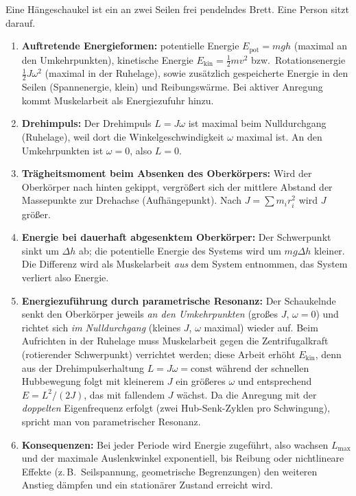 \documentclass[11pt,a4paper]{article}
\begin{document}
Eine Hängeschaukel ist ein an zwei Seilen frei pendelndes Brett.
Eine Person sitzt darauf.

\begin{enumerate}
  \item \textbf{Auftretende Energieformen:} potentielle Energie
        $E_{\mathrm{pot}}=mgh$ (maximal an den Umkehrpunkten),
        kinetische Energie $E_{\mathrm{kin}}=\tfrac{1}{2}mv^{2}$
        bzw.\ Rotationsenergie $\tfrac{1}{2}J\omega^{2}$ (maximal
        in der Ruhelage), sowie zusätzlich gespeicherte Energie in
        den Seilen (Spannenergie, klein) und Reibungswärme.
        Bei aktiver Anregung kommt Muskelarbeit als Energie\-zufuhr
        hinzu.
  \item \textbf{Drehimpuls:} Der Drehimpuls $L=J\omega$ ist
        maximal beim Nulldurchgang (Ruhelage), weil dort die
        Winkelgeschwindigkeit $\omega$ maximal ist. An den
        Umkehrpunkten ist $\omega=0$, also $L=0$.
  \item \textbf{Trägheitsmoment beim Absenken des Oberkörpers:}
        Wird der Oberkörper nach hinten gekippt, vergrößert sich
        der mittlere Abstand der Massepunkte zur Drehachse
        (Aufhängepunkt). Nach $J=\sum m_{i}r_{i}^{2}$ wird
        $J$ größer.
  \item \textbf{Energie bei dauerhaft abgesenktem Oberkörper:}
        Der Schwerpunkt sinkt um $\Delta h$ ab; die potentielle
        Energie des Systems wird um $mg\Delta h$ kleiner. Die
        Differenz wird als Muskelarbeit \emph{aus} dem System
        entnommen, das System verliert also Energie.
  \item \textbf{Energiezuführung durch parametrische Resonanz:}
        Der Schaukelnde senkt den Oberkörper jeweils \emph{an
        den Umkehrpunkten} (großes $J$, $\omega=0$) und richtet
        sich \emph{im Nulldurchgang} (kleines $J$, $\omega$
        maximal) wieder auf. Beim Aufrichten in der Ruhelage muss
        Muskelarbeit gegen die Zentrifugalkraft (rotierender
        Schwerpunkt) verrichtet werden; diese Arbeit erhöht
        $E_{\mathrm{kin}}$, denn aus der Drehimpulserhaltung
        $L=J\omega=\mathrm{const}$ während der schnellen
        Hubbewegung folgt mit kleinerem $J$ ein größeres
        $\omega$ und entsprechend
        $E=L^{2}/(2J)$, das mit fallendem $J$ wächst. Da die
        Anregung mit der \emph{doppelten} Eigenfrequenz erfolgt
        (zwei Hub-Senk-Zyklen pro Schwingung), spricht man von
        parametrischer Resonanz.
  \item \textbf{Konsequenzen:} Bei jeder Periode wird Energie
        zugeführt, also wachsen $L_{\max}$ und der maximale
        Auslenkwinkel exponentiell, bis Reibung oder
        nichtlineare Effekte (z.\,B.\ Seilspannung, geometrische
        Begrenzungen) den weiteren Anstieg dämpfen und ein
        stationärer Zustand erreicht wird.
\end{enumerate}
\end{document}
